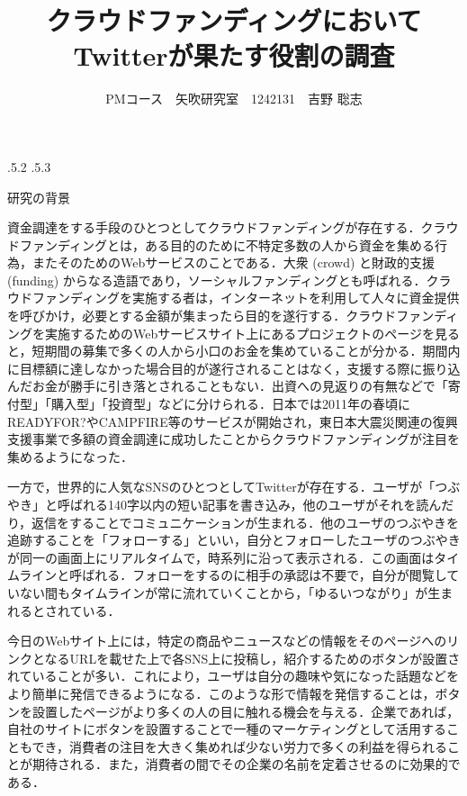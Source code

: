 \documentclass[uplatex]{jsarticle}
\title{\vspace{-14mm}クラウドファンディングにおいてTwitterが果たす役割の調査}
\author{PMコース　矢吹研究室　1242131　吉野 聡志}
\date{}%
\makeatletter
\renewcommand{\section}{%
    \if@slide\clearpage\fi
    \@startsection{section}{1}{\z@}%
    {\Cvs \@plus.5\Cdp \@minus.2\Cdp}%
    {.5\Cvs \@plus.3\Cdp}%
    {\normalfont\raggedright}}
\makeatother
\begin{document}
\maketitle





\section{研究の背景}

資金調達をする手段のひとつとしてクラウドファンディングが存在する．クラウドファンディングとは，ある目的のために不特定多数の人から資金を集める行為，またそのためのWebサービスのことである．大衆 (crowd) と財政的支援 (funding) からなる造語であり，ソーシャルファンディングとも呼ばれる．クラウドファンディングを実施する者は，インターネットを利用して人々に資金提供を呼びかけ，必要とする金額が集まったら目的を遂行する．クラウドファンディングを実施するためのWebサービスサイト上にあるプロジェクトのページを見ると，短期間の募集で多くの人から小口のお金を集めていることが分かる．期間内に目標額に達しなかった場合目的が遂行されることはなく，支援する際に振り込んだお金が勝手に引き落とされることもない．出資への見返りの有無などで「寄付型」「購入型」「投資型」などに分けられる．日本では2011年の春頃にREADYFOR?やCAMPFIRE等のサービスが開始され，東日本大震災関連の復興支援事業で多額の資金調達に成功したことからクラウドファンディングが注目を集めるようになった．

一方で，世界的に人気なSNSのひとつとしてTwitterが存在する．ユーザが「つぶやき」と呼ばれる140字以内の短い記事を書き込み，他のユーザがそれを読んだり，返信をすることでコミュニケーションが生まれる．他のユーザのつぶやきを追跡することを「フォローする」といい，自分とフォローしたユーザのつぶやきが同一の画面上にリアルタイムで，時系列に沿って表示される．この画面はタイムラインと呼ばれる．フォローをするのに相手の承認は不要で，自分が閲覧していない間もタイムラインが常に流れていくことから，「ゆるいつながり」が生まれるとされている．

今日のWebサイト上には，特定の商品やニュースなどの情報をそのページへのリンクとなるURLを載せた上で各SNS上に投稿し，紹介するためのボタンが設置されていることが多い．これにより，ユーザは自分の趣味や気になった話題などをより簡単に発信できるようになる．このような形で情報を発信することは，ボタンを設置したページがより多くの人の目に触れる機会を与える．企業であれば，自社のサイトにボタンを設置することで一種のマーケティングとして活用することもでき，消費者の注目を大きく集めれば少ない労力で多くの利益を得られることが期待される．また，消費者の間でその企業の名前を定着させるのに効果的である．
\end{document}
